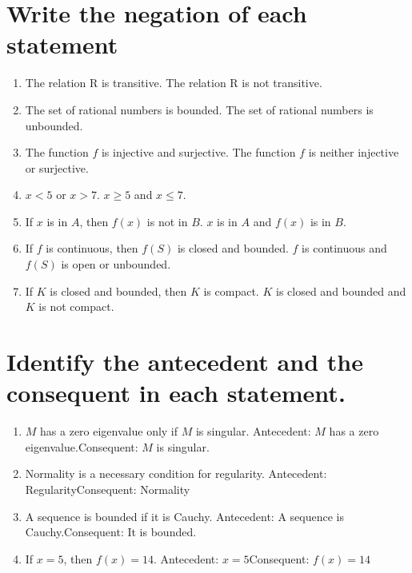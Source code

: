 \documentclass[11pt]{article} %
\begin{document}
\section{Write the negation of each statement}
\begin{enumerate}
	\item The relation R is transitive.
	\subitem The relation R is not transitive.
	
	\item The set of rational numbers is bounded.
	\subitem The set of rational numbers is unbounded.
	
	\item The function $f$ is injective and surjective.
	\subitem The function $f$ is neither injective or surjective.
	
	\item $x<5$ or $x>7$.
	\subitem $x \geq 5$ and $x \leq 7$.

	\item If $x$ is in $A$, then $f(x)$ is not in $B$.
	\subitem $x$ is in $A$ and $f(x)$ is in $B$.
	
	\item If $f$ is continuous, then $f(S)$ is closed and bounded.
	\subitem $f$ is continuous and $f(S)$ is open or unbounded.
	
	\item If $K$ is closed and bounded, then $K$ is compact.
	\subitem $K$ is closed and bounded and $K$ is not compact.

\end{enumerate}

\section{Identify the antecedent and the consequent in each statement.}
\begin{enumerate}
	\item $M$ has a zero eigenvalue only if $M$ is singular.
	\subitem Antecedent: $M$ has a zero eigenvalue.\subitem Consequent: $M$ is singular.
	
	\item Normality is a necessary condition for regularity.
	\subitem Antecedent: Regularity\subitem Consequent: Normality
	
	\item A sequence is bounded if it is Cauchy.
	\subitem Antecedent: A sequence is Cauchy.\subitem Consequent: It is bounded.
	
	\item If $x=5$, then $f(x)=14$.
	\subitem Antecedent: $x=5$\subitem Consequent: $f(x)=14$
\end{enumerate}
\end{document}
